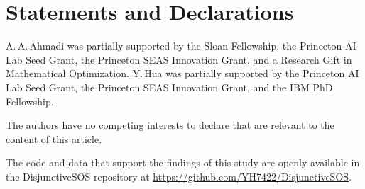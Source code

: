 \documentclass[12pt]{article}
\theoremstyle{remark}
\begin{document}
\ifpreprint\else
\section*{Statements and Declarations}
A.\,A.\,Ahmadi was partially supported by the Sloan Fellowship, the Princeton AI Lab Seed Grant, the Princeton SEAS Innovation Grant, and a Research Gift in Mathematical Optimization.
Y.\,Hua was partially supported by the Princeton AI Lab Seed Grant, the Princeton SEAS Innovation Grant, and the IBM PhD Fellowship.

The authors have no competing interests to declare that are relevant to the content of this article.

The code and data that support the findings of this study are openly available in the DisjunctiveSOS repository at \url{https://github.com/YH7422/DisjunctiveSOS}.
\fi





\ifpreprint
\printbibliography
\else

\fi
\end{document}
